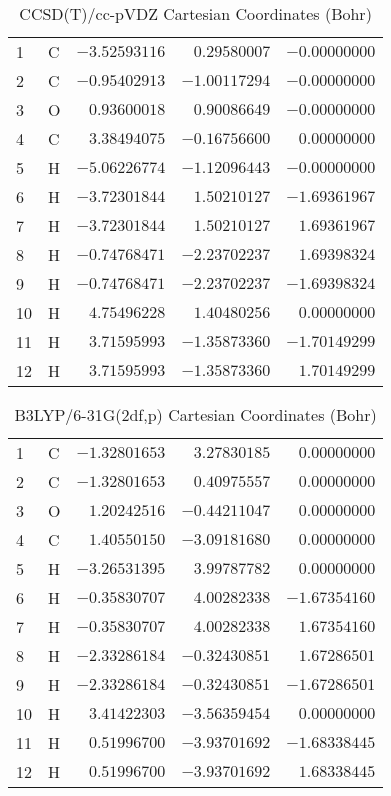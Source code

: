 \documentclass[10pt,oneside]{article}
\begin{document}
\begin{table}[h!]
\centering
\caption{CCSD(T)/cc-pVDZ Cartesian Coordinates (Bohr)}
\begin{tabular}{llrrr}
1  & C  & $-3.52593116$ & $ 0.29580007$ & $-0.00000000$ \\
2  & C  & $-0.95402913$ & $-1.00117294$ & $-0.00000000$ \\
3  & O  & $ 0.93600018$ & $ 0.90086649$ & $-0.00000000$ \\
4  & C  & $ 3.38494075$ & $-0.16756600$ & $ 0.00000000$ \\
5  & H  & $-5.06226774$ & $-1.12096443$ & $-0.00000000$ \\
6  & H  & $-3.72301844$ & $ 1.50210127$ & $-1.69361967$ \\
7  & H  & $-3.72301844$ & $ 1.50210127$ & $ 1.69361967$ \\
8  & H  & $-0.74768471$ & $-2.23702237$ & $ 1.69398324$ \\
9  & H  & $-0.74768471$ & $-2.23702237$ & $-1.69398324$ \\
10 & H  & $ 4.75496228$ & $ 1.40480256$ & $ 0.00000000$ \\
11 & H  & $ 3.71595993$ & $-1.35873360$ & $-1.70149299$ \\
12 & H  & $ 3.71595993$ & $-1.35873360$ & $ 1.70149299$ \\
\end{tabular}
\end{table}

\begin{table}[h!]
\centering
\caption{B3LYP/6-31G(2df,p) Cartesian Coordinates (Bohr)}
\begin{tabular}{llrrr}
1  & C  & $-1.32801653$ & $ 3.27830185$ & $ 0.00000000$ \\
2  & C  & $-1.32801653$ & $ 0.40975557$ & $ 0.00000000$ \\
3  & O  & $ 1.20242516$ & $-0.44211047$ & $ 0.00000000$ \\
4  & C  & $ 1.40550150$ & $-3.09181680$ & $ 0.00000000$ \\
5  & H  & $-3.26531395$ & $ 3.99787782$ & $ 0.00000000$ \\
6  & H  & $-0.35830707$ & $ 4.00282338$ & $-1.67354160$ \\
7  & H  & $-0.35830707$ & $ 4.00282338$ & $ 1.67354160$ \\
8  & H  & $-2.33286184$ & $-0.32430851$ & $ 1.67286501$ \\
9  & H  & $-2.33286184$ & $-0.32430851$ & $-1.67286501$ \\
10 & H  & $ 3.41422303$ & $-3.56359454$ & $ 0.00000000$ \\
11 & H  & $ 0.51996700$ & $-3.93701692$ & $-1.68338445$ \\
12 & H  & $ 0.51996700$ & $-3.93701692$ & $ 1.68338445$ \\
\end{tabular}
\end{table}
\end{document}
